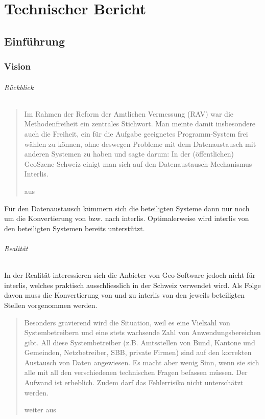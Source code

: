 \part{Technischer Bericht}\label{part:tb}
\glsresetall


\chapter{Einführung}

\section{Vision}\label{sec:tb:vision}
\paragraph{Rückblick}
\blockquote[aus \cite{rahmenvorst-interlisopen}]{Im Rahmen der Reform der Amtlichen Vermessung (RAV) war die Methodenfreiheit ein zentrales Stichwort. Man meinte damit insbesondere auch die Freiheit, ein für die Aufgabe geeignetes Programm-System frei wählen zu können, ohne deswegen Probleme mit dem Datenaustausch mit anderen Systemen zu haben und sagte darum: In der (öffentlichen) GeoSzene-Schweiz einigt man sich auf den Datenaustausch-Mechanismus Interlis.}

Für den Datenaustausch kümmern sich die beteiligten Systeme dann nur noch um die Konvertierung von bzw. nach \gls{interlis}. Optimalerweise wird \gls{interlis} von den beteiligten Systemen bereits unterstützt.

\paragraph{Realität}
In der Realität interessieren sich die Anbieter von Geo-Software jedoch nicht für \gls{interlis}, welches praktisch ausschliesslich in der Schweiz verwendet wird. Als Folge davon muss die Konvertierung von und zu \gls{interlis} von den jeweils beteiligten Stellen vorgenommen werden.

\blockquote[weiter aus \cite{rahmenvorst-interlisopen}]{Besonders gravierend wird die Situation, weil es eine Vielzahl von Systembetreibern und eine stets wachsende Zahl von Anwendungsbereichen gibt. All diese Systembetreiber (z.B. Amtsstellen von Bund, Kantone und Gemeinden, Netzbetreiber, SBB, private Firmen) sind auf den korrekten Austausch von Daten angewiesen. Es macht aber wenig Sinn, wenn sie sich alle mit all den verschiedenen technischen Fragen befassen müssen. Der Aufwand ist erheblich. Zudem darf das Fehlerrisiko nicht unterschätzt werden.}

